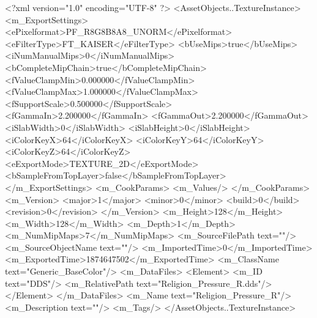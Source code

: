 <?xml version="1.0" encoding="UTF-8" ?>
<AssetObjects..TextureInstance>
	<m_ExportSettings>
		<ePixelformat>PF_R8G8B8A8_UNORM</ePixelformat>
		<eFilterType>FT_KAISER</eFilterType>
		<bUseMips>true</bUseMips>
		<iNumManualMips>0</iNumManualMips>
		<bCompleteMipChain>true</bCompleteMipChain>
		<fValueClampMin>0.000000</fValueClampMin>
		<fValueClampMax>1.000000</fValueClampMax>
		<fSupportScale>0.500000</fSupportScale>
		<fGammaIn>2.200000</fGammaIn>
		<fGammaOut>2.200000</fGammaOut>
		<iSlabWidth>0</iSlabWidth>
		<iSlabHeight>0</iSlabHeight>
		<iColorKeyX>64</iColorKeyX>
		<iColorKeyY>64</iColorKeyY>
		<iColorKeyZ>64</iColorKeyZ>
		<eExportMode>TEXTURE_2D</eExportMode>
		<bSampleFromTopLayer>false</bSampleFromTopLayer>
	</m_ExportSettings>
	<m_CookParams>
		<m_Values/>
	</m_CookParams>
	<m_Version>
		<major>1</major>
		<minor>0</minor>
		<build>0</build>
		<revision>0</revision>
	</m_Version>
	<m_Height>128</m_Height>
	<m_Width>128</m_Width>
	<m_Depth>1</m_Depth>
	<m_NumMipMaps>7</m_NumMipMaps>
	<m_SourceFilePath text=""/>
	<m_SourceObjectName text=""/>
	<m_ImportedTime>0</m_ImportedTime>
	<m_ExportedTime>1874647502</m_ExportedTime>
	<m_ClassName text="Generic_BaseColor"/>
	<m_DataFiles>
		<Element>
			<m_ID text="DDS"/>
			<m_RelativePath text="Religion_Pressure_{R}.dds"/>
		</Element>
	</m_DataFiles>
	<m_Name text="Religion_Pressure_{R}"/>
	<m_Description text=""/>
	<m_Tags/>
</AssetObjects..TextureInstance>

